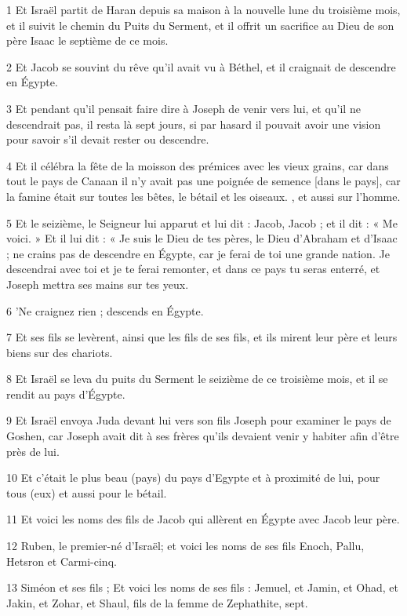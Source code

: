 \par 1 Et Israël partit de Haran depuis sa maison à la nouvelle lune du troisième mois, et il suivit le chemin du Puits du Serment, et il offrit un sacrifice au Dieu de son père Isaac le septième de ce mois.
\par 2 Et Jacob se souvint du rêve qu'il avait vu à Béthel, et il craignait de descendre en Égypte.
\par 3 Et pendant qu'il pensait faire dire à Joseph de venir vers lui, et qu'il ne descendrait pas, il resta là sept jours, si par hasard il pouvait avoir une vision pour savoir s'il devait rester ou descendre.
\par 4 Et il célébra la fête de la moisson des prémices avec les vieux grains, car dans tout le pays de Canaan il n'y avait pas une poignée de semence [dans le pays], car la famine était sur toutes les bêtes, le bétail et les oiseaux. , et aussi sur l'homme.
\par 5 Et le seizième, le Seigneur lui apparut et lui dit : Jacob, Jacob ; et il dit : « Me voici. » Et il lui dit : « Je suis le Dieu de tes pères, le Dieu d'Abraham et d'Isaac ; ne crains pas de descendre en Égypte, car je ferai de toi une grande nation. Je descendrai avec toi et je te ferai remonter, et dans ce pays tu seras enterré, et Joseph mettra ses mains sur tes yeux.
\par 6 'Ne craignez rien ; descends en Égypte.
\par 7 Et ses fils se levèrent, ainsi que les fils de ses fils, et ils mirent leur père et leurs biens sur des chariots.
\par 8 Et Israël se leva du puits du Serment le seizième de ce troisième mois, et il se rendit au pays d'Égypte.
\par 9 Et Israël envoya Juda devant lui vers son fils Joseph pour examiner le pays de Goshen, car Joseph avait dit à ses frères qu'ils devaient venir y habiter afin d'être près de lui.
\par 10 Et c'était le plus beau (pays) du pays d'Egypte et à proximité de lui, pour tous (eux) et aussi pour le bétail.
\par 11 Et voici les noms des fils de Jacob qui allèrent en Égypte avec Jacob leur père.
\par 12 Ruben, le premier-né d'Israël; et voici les noms de ses fils Enoch, Pallu, Hetsron et Carmi-cinq.
\par 13 Siméon et ses fils ; Et voici les noms de ses fils : Jemuel, et Jamin, et Ohad, et Jakin, et Zohar, et Shaul, fils de la femme de Zephathite, sept.
